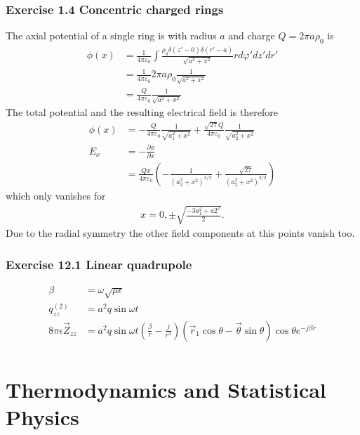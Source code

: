 \documentclass[10pt,a4paper]{book}
\theoremstyle{definition}
\begin{document}
\subsection{Exercise 1.4 Concentric charged rings}
The axial potential of a single ring is with radius $a$ and charge $Q=2\pi a\rho_0$ is
\begin{align}
    \phi(x)&=\frac{1}{4\pi\varepsilon_0}\int\frac{\rho_0\delta(z'-0)\delta(r'-a)}{\sqrt{a^2+x^2}}r d\varphi' dz' dr'\\
    &=\frac{1}{4\pi\varepsilon_0}2\pi a \rho_0\frac{1}{\sqrt{a^2+x^2}}\\
    &=\frac{Q}{4\pi\varepsilon_0}\frac{1}{\sqrt{a^2+x^2}}
\end{align}
The total potential and the resulting electrical field is therefore
\begin{align}
    \phi(x)&=-\frac{Q}{4\pi\varepsilon_0}\frac{1}{\sqrt{a_1^2+x^2}}+\frac{\sqrt{27}Q}{4\pi\varepsilon_0}\frac{1}{\sqrt{a_2^2+x^2}}\\
    E_x&=-\frac{\partial\phi}{\partial x}\\
    &=\frac{Qx}{4\pi\varepsilon_0}\left(-\frac{1}{(a_2^2+x^2)^{3/2}}+\frac{\sqrt{27}}{(a_2^2+x^2)^{3/2}}\right)
\end{align}
which only vanishes for
\begin{align}
    x=0,\pm\sqrt{\frac{-3a_1^2+a2^2}{2}}.
\end{align}
Due to the radial symmetry the other field components at this points vanish too.

\subsection{Exercise 12.1 Linear quadrupole}
\begin{align}
    \beta&=\omega\sqrt{\mu\epsilon}\\
    q_{zz}^{(2)}&=a^2q\sin\omega t\\
    8\pi\epsilon\vec{Z}_{zz}&=a^2q\sin\omega t\left(\frac{\beta}{r}-\frac{j}{r^2}\right)(\vec{r}_1\cos\theta-\vec{\theta}\sin\theta)\cos\theta e^{-j\beta r}\\
\end{align}

\chapter{Thermodynamics and Statistical Physics}
\end{document}
